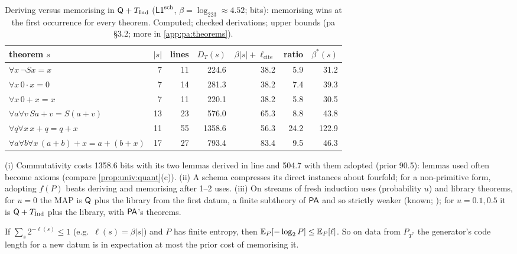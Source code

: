 \begin{table}[t]\centering\footnotesize
\begin{tabular}{@{}lrrrrrr@{}}
\toprule
theorem $s$ & $|s|$ & lines & $D_T(s)$ & $\beta|s|+\ell_{\mathrm{cite}}$ & ratio & $\beta^*(s)$\\
\midrule
$\forall x\,\neg Sx=x$ & 7 & 11 & 224.6 & 38.2 & 5.9 & 31.2\\
$\forall x\,0\cdot x=0$ & 7 & 14 & 281.3 & 38.2 & 7.4 & 39.3\\
$\forall x\,0+x=x$ & 7 & 11 & 220.1 & 38.2 & 5.8 & 30.5\\
$\forall a\forall v\,Sa+v=S(a+v)$ & 13 & 23 & 576.0 & 65.3 & 8.8 & 43.8\\
$\forall q\forall x\,x+q=q+x$ & 11 & 55 & 1358.6 & 56.3 & 24.2 & 122.9\\
$\forall a\forall b\forall x\,(a+b)+x=a+(b+x)$ & 17 & 27 & 793.4 & 83.4 & 9.5 & 46.3\\
\bottomrule
\end{tabular}
\caption{Deriving versus memorising in $\mathsf{Q}+T_{\mathrm{Ind}}$ ($\mathord{\mathsf{L1}}^{\mathrm{sch}}$, $\beta=\log_223\approx4.52$; bits): memorising wins at the first occurrence for every theorem. Computed; checked derivations; upper bounds (pa \S3.2; more in \cref{app:pa:theorems}).}\label{tab:pa:theorems}
\end{table}

\begin{remark}\pabrk{}\label{rem:pa:streams}
(i) Commutativity costs 1358.6 bits with its two lemmas derived in line and 504.7 with them adopted (prior 90.5): lemmas used often become axioms (compare \cref{prop:univ:quant}(c)). (ii) A schema compresses its direct instances about fourfold; for a non-primitive form, adopting $f(P)$ beats deriving and memorising after 1--2 uses. (iii) On streams of fresh induction uses (probability $u$) and library theorems, for $u=0$ the MAP is $\mathsf{Q}$ plus the library from the first datum, a finite subtheory of $\mathsf{PA}$ and so strictly weaker (known; \citealp{rylln1952axiomatizability}); for $u=0.1,0.5$ it is $\mathsf{Q}+T_{\mathrm{Ind}}$ plus the library, with $\mathsf{PA}$'s theorems.
\end{remark}

\begin{proposition}[Gibbs]\pabrk{}\label{prop:pa:gibbs}
If $\sum_s2^{-\ell(s)}\le1$ (e.g.\ $\ell(s)=\beta|s|$) and $P$ has finite entropy, then $\mathbb{E}_P[-\log_2P]\le\mathbb{E}_P[\ell]$. So on data from $P_{T^*}$ the generator's code length for a new datum is in expectation at most the prior cost of memorising it.
\end{proposition}

